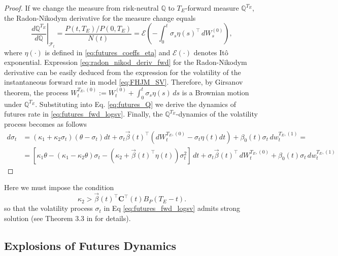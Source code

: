 \documentclass[pdftex,11pt,a4paper] {article}
\begin{document}
\begin{proof}
If we change the measure from risk-neutral $\mathbb{Q}$ to $T_E$-forward measure $\mathbb{Q}^{T_E}$, the Radon-Nikodym derivative for the measure change equals 
\begin{equation}\label{eq:radon_nikod_deriv_fwd}
\left.\frac{d\mathbb{Q}^{T_E}}{d\mathbb{Q}}\right|_{\mathcal{F}_t}
=\frac{P(t,T_E)/P(0,T_E)}{N(t)}
=\mathcal{E}\left(-\int_0^t \sigma_s\eta(s)^\top\,dW^{(0)}_s\right),
\end{equation}
where $\eta(\cdot)$ is defined in \eqref{eq:futures_coeffs_eta} and $\mathcal{E}(\cdot)$ denotes It\^{o} exponential. Expression \eqref{eq:radon_nikod_deriv_fwd} for the Radon-Nikodym derivative can be easily deduced from the expression for the volatility of the instantaneous forward rate in model \eqref{eq:FHJM_SV}. Therefore, by Girsanov theorem, the process 
$W^{T_E,(0)}_t:=W_t^{(0)}+\int_0^t\sigma_s\eta(s)\,ds$ 
is a Brownian motion under $\mathbb{Q}^{T_E}$. Substituting into Eq. \eqref{eq:futures_Q} we derive the dynamics of futures rate in \eqref{eq:futures_fwd_logsv}. Finally, the $\mathbb{Q}^{T_E}$-dynamics of the volatility process becomes as follows
\begin{equation*}
\begin{split}
d\sigma_t&=\left(\kappa_{1}+\kappa_{2}\sigma_t\right)(\theta-\sigma_t)dt + \sigma_t\vec{\beta}(t)^\top (dW^{T_E,(0)}_t-\sigma_t\eta(t)dt)+\beta_0(t)\sigma_t\,dw^{T_E,(1)}_t=\\
&=[\kappa_1\theta-(\kappa_1-\kappa_2\theta)\sigma_t-(\kappa_2+\vec{\beta}(t)^\top\eta(t))\sigma_t^2]\,dt +\sigma_t\vec{\beta}(t)^\top\,dW^{T_E, (0)}_t+\beta_0(t)\sigma_t\,dw^{T_E,(1)}_t
\end{split}
\end{equation*}
\end{proof}
Here we must impose the condition 
\begin{equation}\label{eq:kappa2_cond_QT}
\kappa_{2}>\vec{\beta}(t)^\top \mathbf{C}^\top(t) B_P(T_E-t).
\end{equation} 
so that the volatility process $\sigma_t$ in Eq \eqref{eq:futures_fwd_logsv} admits strong solution (see Theorem 3.3 in \cite{Sepp2024} for details). 



\subsection{Explosions of Futures Dynamics}\label{sec:futures_explosion}
 
\end{document}
